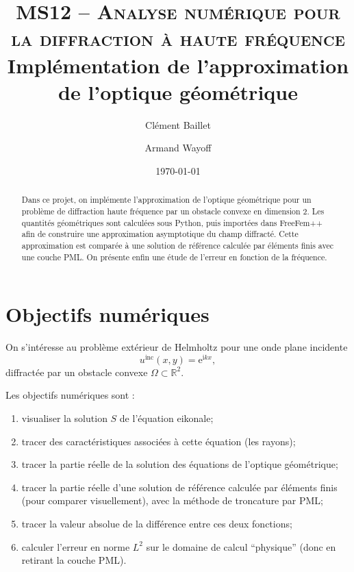 \documentclass{article}
\title{
    {\Large \textsc{MS12 -- Analyse numérique pour la diffraction à haute fréquence}} \\[15pt]
    \textbf{Implémentation de l’approximation de l’optique géométrique}
}
\author{Clément Baillet \and Armand Wayoff}
\date{\today}
\begin{document}
\pagestyle{fancy}
\fancyhead{}\fancyfoot{}
\fancyfoot[C]{\textbf{\thepage}}

\maketitle

\begin{abstract}
Dans ce projet, on implémente l'approximation de l’optique géométrique pour un problème de diffraction haute fréquence par un obstacle convexe en dimension 2. Les quantités géométriques sont calculées sous Python, puis importées dans FreeFem++ afin de construire une approximation asymptotique du champ diffracté. Cette approximation est comparée à une solution de référence calculée par éléments finis avec une couche PML. On présente enfin une étude de l’erreur en fonction de la fréquence.
\end{abstract}

\tableofcontents

\section{Objectifs numériques}

\noindent On s’intéresse au problème extérieur de Helmholtz pour une onde plane incidente
\[
u^{\mathrm{inc}}(x,y)=\mathrm{e}^{\mathrm{i} k x},
\]
diffractée par un obstacle convexe \(\Omega \subset \mathbb{R}^2\).

\noindent Les objectifs numériques sont :

\begin{enumerate}
    \item visualiser la solution $S$ de l’équation eikonale;
    \item tracer des caractéristiques associées à cette équation (les rayons);
    \item tracer la partie réelle de la solution des équations de l’optique géométrique;
    \item tracer la partie réelle d’une solution de référence calculée par éléments finis (pour comparer visuellement), avec la méthode de troncature par PML;    
    \item tracer la valeur absolue de la différence entre ces deux fonctions;    
    \item calculer l’erreur en norme $L^2$ sur le domaine de calcul ``physique'' (donc en retirant la couche PML).
\end{enumerate}
\end{document}
